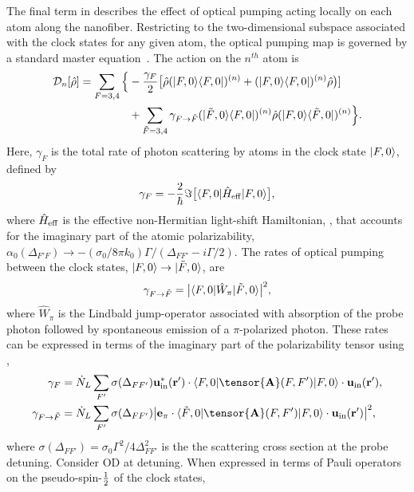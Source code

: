 \documentclass[preprint,aps,pra,onecolumn]{revtex4-1} %
\newcommand{\inp}{{\rm in}}
\newcommand{\charpol}{\alpha_0(\Delta_{F'F})}
\newcommand{\half}{\smallfrac{1}{2}}
\newcommand{\comment}[1]{{\color{Maroon} #1}}
\begin{document}
The final term in  describes the effect of optical pumping acting locally on each atom along the nanofiber. 
Restricting to the two-dimensional subspace associated with the clock states for any given atom, the optical pumping map is governed by a standard master equation~\cite{deutsch_quantum_2010}.  
The action on the $n^{th}$ atom is
	\begin{align}
		\mathcal{D}_n[\hat{\rho}] =  \sum_{F=3,4} \Big\{& -\frac{\gamma_{F}}{2} \big[ \hat{\rho} (\lvert{F,0}\rangle\langle{F,0}\rvert)^{(n)} + (\lvert{F,0}\rangle\langle{F,0}\rvert)^{(n)}\hat{\rho} \big)]\\
		&+  \sum_{\tilde{F} =3,4}  \gamma_{F \rightarrow \tilde{F}}(\lvert{\tilde{F},0}\rangle\langle{F,0}\rvert)^{(n)} \hat{\rho}(\lvert{F,0}\rangle\langle{\tilde{F},0}\rvert)^{(n)} \Big\}.\nonumber
	\end{align}
Here, $\gamma_{F}$ is the total rate of photon scattering by atoms in the clock state $\lvert{F,0}\rangle$, defined by
	\begin{equation}
		\gamma_{F}=- \frac{2}{\hbar} \Im \big[ \langle{F,0}\rvert \hat{H}_{\rm eff}\lvert{F,0}\rangle \big] ,
	\end{equation}
where $\hat{H}_{\text{eff}}$ is the effective non-Hermitian light-shift Hamiltonian, , that accounts for the imaginary part of the atomic polarizability, $\charpol \rightarrow -(\sigma_0/8\pi k_0) \Gamma/(\Delta_{FF'}-i\Gamma/2)$. 
The rates of optical pumping between the clock states, $\lvert{F,0}\rangle \rightarrow \lvert{\tilde{F},0}\rangle$, are
	\begin{equation}
		\gamma_{F \rightarrow \tilde{F} } =\big| \langle{F,0}\rvert \hat{W}_\pi \lvert{\tilde{F},0}\rangle \big|^2,
	\end{equation}
where $\hat{W}_\pi$ is the Lindbald jump-operator associated with absorption of the probe photon followed by spontaneous emission of a $\pi$-polarized photon.  
These rates can be expressed in terms of the imaginary part of the polarizability tensor using ,
	\begin{align}
		\gamma_F &=\dot{N}_L  \sum_{F'} \sigma (\Delta_{FF'} ) \mathbf{u}^*_\inp(\br')\cdot \bra{F,0} \tensor{\mathbf{A}}(F,F') \ket{F,0}  \cdot \mathbf{u}_\inp(\br'), \\
		\gamma_{F \rightarrow \tilde{F}}&=  \dot{N}_L  \sum_{F'} \sigma (\Delta_{FF'}) \big| \mathbf{e}_\pi\cdot \bra{\tilde{F},0} \tensor{\mathbf{A}}(F,F') \ket{F,0}  \cdot \mathbf{u}_\inp(\br') \big|^2 ,
	\end{align}
where $ \sigma (\Delta_{FF'} )  = \sigma_0 \Gamma^2/4\Delta^2_{FF'}$ is the the scattering cross section at the probe detuning. \comment{Consider OD at detuning.} When expressed in terms of Pauli operators on the pseudo-spin-$\half$ of the clock states,
\end{document}
